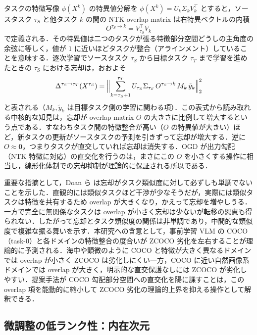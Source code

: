 タスクの特徴写像 $\phi(X^k)$ の特異値分解を $\phi(X^k)=U_k\Sigma_k V_k^{\top}$ とすると，ソースタスク $\tau_S$ と他タスク $k$ の間の NTK overlap matrix は右特異ベクトルの内積
\begin{equation}
O^{\tau_S\rightarrow k}=V_{\tau_S}^{\top}V_k
\end{equation}
で定義される．その特異値は二つのタスクが張る特徴部分空間どうしの主角度の余弦に等しく，値が $1$ に近いほどタスクが整合（アラインメント）していることを意味する．逐次学習でソースタスク $\tau_S$ から目標タスク $\tau_T$ まで学習を進めたときの $\tau_S$ における忘却は，おおよそ
\begin{equation}
\Delta^{\tau_S\rightarrow\tau_T}(X^{\tau_S})=\Bigl\|\sum_{k=\tau_S+1}^{\tau_T} U_{\tau_S}\Sigma_{\tau_S}\,O^{\tau_S\rightarrow k}\,M_k\,\tilde{y}_k\Bigr\|_2^2
\end{equation}
と表される（$M_k,\tilde{y}_k$ は目標タスク側の学習に関わる項）．この表式から読み取れる中核的な知見は，忘却が overlap matrix $O$ の大きさに比例して増大するという点である．すなわちタスク間の特徴整合が高い（$O$ の特異値が大きい）ほど，新タスクの更新がソースタスクの予測を引きずって忘却が増大する．逆に $O\approx\mathbf{0}$，つまりタスクが直交していれば忘却は消失する．OGD が出力勾配（NTK 特徴に対応）の直交化を行うのは，まさにこの $O$ を小さくする操作に相当し，線形化体制での忘却抑制が理論的に保証される所以である．

重要な指摘として，Doan ら \cite{ntkoverlap} は忘却がタスク類似度に対して必ずしも単調でないことを示した．直観的には類似タスクほど干渉が少なそうだが，実際には類似タスクは特徴を共有するため overlap が大きくなり，かえって忘却を増やしうる．一方で完全に無関係なタスクは overlap が小さく忘却は少ないが転移の恩恵も得られない．したがって忘却とタスク類似度の関係は非単調であり，中間的な類似度で複雑な振る舞いを示す．本研究への含意として，事前学習 VLM の COCO（task-0）と各ドメインの特徴整合の度合いが ZCOCO 劣化を左右することが理論的に予測される．海中や顕微のように COCO と特徴が大きく異なるドメインでは overlap が小さく ZCOCO は劣化しにくい一方，COCO に近い自然画像系ドメインでは overlap が大きく，明示的な直交保護なしには ZCOCO が劣化しやすい．提案手法が COCO 勾配部分空間への直交化を陽に課すことは，この overlap 項を能動的に縮小して ZCOCO 劣化の理論的上界を抑える操作として解釈できる．

\subsection{微調整の低ランク性：内在次元}


